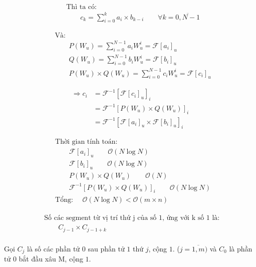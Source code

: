 \documentclass[12pt]{report}
\begin{document}
\begin{align*}
    &\textrm{Thì ta có: } \\
    &\quad\quad c_k = \sum_{i = 0} ^ {k} a_i \times b_{k - i}
    \quad\quad \forall k = \overline{0, N - 1}
\end{align*}

\begin{align*}
    &\textrm{Và: } \\
    &\quad\quad P(W_u) = \sum_{i = 0}^{N - 1} a_i W_u^i 
    = \mathcal{F}[a_i]_u \\
    &\quad\quad Q(W_u) = \sum_{i = 0}^{N - 1} b_i W_u^i 
    = \mathcal{F}[b_i]_u \\
    &\quad\quad P(W_u) \times Q(W_u) = \sum_{i = 0}^{N - 1} c_i W_u^i
    = \mathcal{F}[c_i]_u
\end{align*}

\begin{align*}
    \Rightarrow c_i 
    &= \mathcal{F}^{-1} \left[ \mathcal{F}[c_i]_u \right]_i \\
    &= \mathcal{F}^{-1} \left[ P(W_u) \times Q(W_u) \right]_i \\
    &= \mathcal{F}^{-1} \left[ 
        \mathcal{F}[a_i]_u \times
        \mathcal{F}[b_i]_u \right]_i
\end{align*}

\begin{align*}
    &\textrm{Thời gian tính toán: } \\
    &\quad\quad \mathcal{F}[a_i]_u \quad\quad \mathcal{O}(N \log N) \\
    &\quad\quad \mathcal{F}[b_i]_u \quad\quad \mathcal{O}(N \log N) \\
    &\quad\quad P(W_u) \times Q(W_u) \quad\quad \mathcal{O}(N) \\
    &\quad\quad \mathcal{F}^{-1}[P(W_u) \times Q(W_u)]_i 
    \quad\quad \mathcal{O}(N \log N) \\
    &\textrm{Tổng: } \quad \mathcal{O}(N \log N) < 
                \mathcal{O}\left(m \times n\right)
\end{align*}

\begin{align*}
    &\textrm{Số các segment từ vị trí thứ j của số 1, ứng với k 
    số 1 là: } \\
    &\quad\quad C_{j - 1} \times C_{j - 1 + k} 
\end{align*}\\[1cm]

\noindent Gọi $C_j$ là số các phần tử $0$ sau phần tử $1$ thứ $j$, cộng $1$. 
($j = \overline{1, m})$ và $C_0$ là phần tử $0$ bắt đầu xâu M, cộng $1$.\\[1cm]
\end{document}

